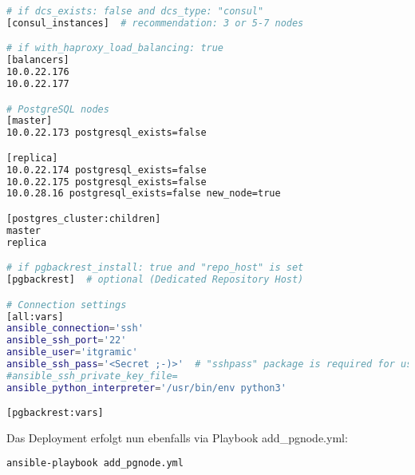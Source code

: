 \begin{flushleft}
\begin{lstlisting}[language=bash, caption=Testsystem - Anhang - add\_pgnode.yml - inventory,captionpos=b,label={lst:testsystem-add-pgnode-inventory},breaklines=true]
# if dcs_exists: false and dcs_type: "consul"
[consul_instances]  # recommendation: 3 or 5-7 nodes

# if with_haproxy_load_balancing: true
[balancers]
10.0.22.176
10.0.22.177

# PostgreSQL nodes
[master]
10.0.22.173 postgresql_exists=false

[replica]
10.0.22.174 postgresql_exists=false
10.0.22.175 postgresql_exists=false
10.0.28.16 postgresql_exists=false new_node=true

[postgres_cluster:children]
master
replica

# if pgbackrest_install: true and "repo_host" is set
[pgbackrest]  # optional (Dedicated Repository Host)

# Connection settings
[all:vars]
ansible_connection='ssh'
ansible_ssh_port='22'
ansible_user='itgramic'
ansible_ssh_pass='<Secret ;-)>'  # "sshpass" package is required for use "ansible_ssh_pass"
#ansible_ssh_private_key_file=
ansible_python_interpreter='/usr/bin/env python3'

[pgbackrest:vars]
    \end{lstlisting}
    Das Deployment erfolgt nun ebenfalls via Playbook add\_pgnode.yml:
    \lstset{style=gra_codestyle}
    \begin{lstlisting}[language=bash, caption=Testsystem - Anhang - add\_pgnode.yml,captionpos=b,label={lst:add-appendix-pgnode},breaklines=true]
ansible-playbook add_pgnode.yml
    \end{lstlisting}
\end{flushleft}